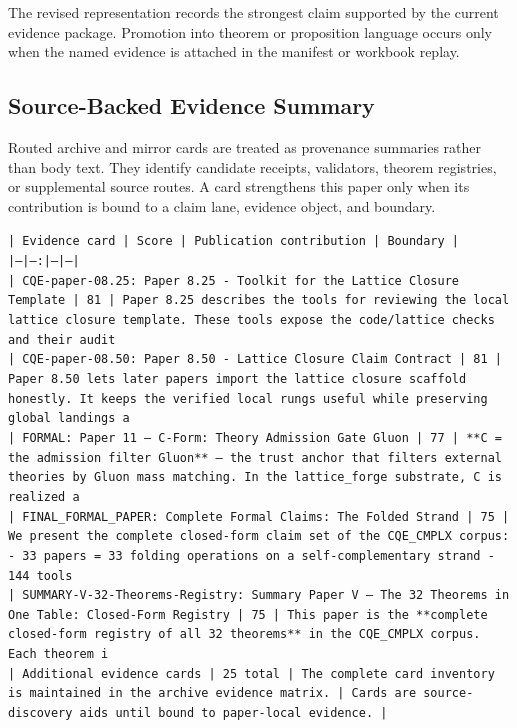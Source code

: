 \documentclass[11pt]{article}
\begin{document}
The revised representation records the strongest claim supported by the current evidence package. Promotion into theorem or proposition language occurs only when the named evidence is attached in the manifest or workbook replay.

\subsection*{Source-Backed Evidence Summary}

Routed archive and mirror cards are treated as provenance summaries rather than
body text. They identify candidate receipts, validators, theorem registries, or
supplemental source routes. A card strengthens this paper only when its
contribution is bound to a claim lane, evidence object, and boundary.

\noindent\texttt{| Evidence card | Score | Publication contribution | Boundary |}\\
\noindent\texttt{|---|---:|---|---|}\\
\noindent\texttt{| CQE-paper-08.25: Paper 8.25 - Toolkit for the Lattice Closure Template | 81 | Paper 8.25 describes the tools for reviewing the local lattice closure template. These tools expose the code/lattice checks and their audit }\\
\noindent\texttt{| CQE-paper-08.50: Paper 8.50 - Lattice Closure Claim Contract | 81 | Paper 8.50 lets later papers import the lattice closure scaffold honestly. It keeps the verified local rungs useful while preserving global landings a}\\
\noindent\texttt{| FORMAL: Paper 11 — C-Form: Theory Admission Gate Gluon | 77 | **C = the admission filter Gluon** — the trust anchor that filters external theories by Gluon mass matching. In the lattice\_forge substrate, C is realized a}\\
\noindent\texttt{| FINAL\_FORMAL\_PAPER: Complete Formal Claims: The Folded Strand | 75 | We present the complete closed-form claim set of the CQE\_CMPLX corpus: - 33 papers = 33 folding operations on a self-complementary strand - 144 tools}\\
\noindent\texttt{| SUMMARY-V-32-Theorems-Registry: Summary Paper V — The 32 Theorems in One Table: Closed-Form Registry | 75 | This paper is the **complete closed-form registry of all 32 theorems** in the CQE\_CMPLX corpus. Each theorem i}\\
\noindent\texttt{| Additional evidence cards | 25 total | The complete card inventory is maintained in the archive evidence matrix. | Cards are source-discovery aids until bound to paper-local evidence. |}\\
\end{document}
